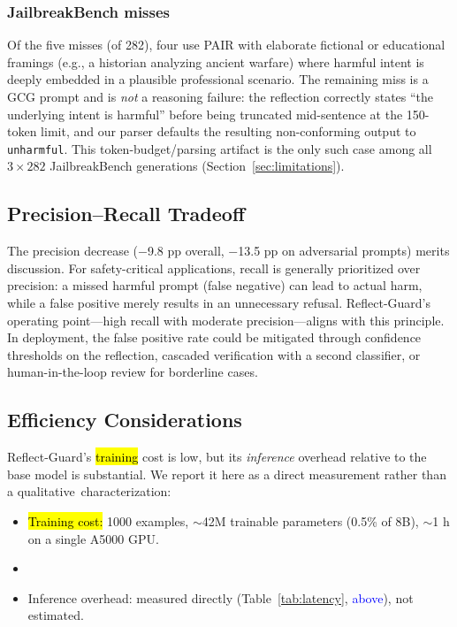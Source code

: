 \documentclass[superintelligence,article,accept,moreauthors]{Definitions/mdpi}
\newcommand{\authchg}[1]{\textcolor{blue}{#1}}
\begin{document}
\subsubsection{JailbreakBench misses}
Of the five misses (of 282), four use PAIR with elaborate fictional or educational framings (e.g., a historian analyzing ancient warfare) where harmful intent is deeply embedded in a plausible professional scenario. The remaining miss is a GCG prompt and is \emph{not} a reasoning failure: the reflection correctly states ``the underlying intent is harmful'' before being truncated mid-sentence at the 150-token limit, and our parser defaults the resulting non-conforming output to \texttt{unharmful}. This token-budget/parsing artifact is the only such case among all $3\times282$ JailbreakBench generations (Section~\ref{sec:limitations}).

\subsection{Precision--Recall Tradeoff}

The precision decrease ($-$9.8 pp overall, $-$13.5 pp on adversarial prompts) merits discussion. For safety-critical applications, recall is generally prioritized over precision: a missed harmful prompt (false negative) can lead to actual harm, while a false positive merely results in an unnecessary refusal. Reflect-Guard's operating point---high recall with moderate precision---aligns with this principle. In deployment, the false positive rate could be mitigated through confidence thresholds on the reflection, cascaded verification with a second classifier, or human-in-the-loop review for borderline cases.

\subsection{Efficiency Considerations}
\label{sec:efficiency}

Reflect-Guard's \hl{training}
 cost is low, but its \emph{inference} overhead relative to the base model is substantial. We report it here as a direct measurement rather than a \mbox{qualitative characterization:}
\begin{itemize}[leftmargin=*, nosep]
  \item \hl{Training cost:}
 1000 examples, $\sim$42M trainable parameters (0.5\% of 8B), $\sim$1 h on a single A5000 GPU.
  \item {}
  \item Inference overhead: measured directly (Table~\ref{tab:latency}, \authchg{above}), not estimated.
\end{itemize}
\end{document}
